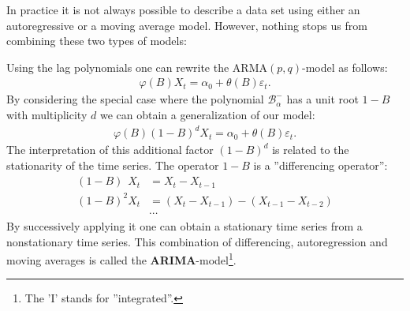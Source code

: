 
    In practice it is not always possible to describe a data set using either an autoregressive or a moving average model. However, nothing stops us from combining these two types of models:

    Using the lag polynomials one can rewrite the $\text{ARMA}(p,q)$-model as follows:
    \begin{gather}
        \varphi(B)X_t = \alpha_0 + \theta(B)\varepsilon_t.
    \end{gather}
    By considering the special case where the polynomial $\mathcal{B}^-_\alpha$ has a unit root $1-B$ with multiplicity $d$ we can obtain a generalization of our model:
    \begin{gather}
        \varphi(B)(1-B)^dX_t = \alpha_0 + \theta(B)\varepsilon_t.
    \end{gather}
    The interpretation of this additional factor $(1-B)^d$ is related to the stationarity of the time series. The operator $1-B$ is a ''differencing operator'':
    \begin{align*}
        (1-B)\phantom{^2}X_t &= X_t - X_{t-1}\\
        (1-B)^2X_t &= (X_t-X_{t-1}) - (X_{t-1}-X_{t-2})\\
        &\cdots
    \end{align*}
    By successively applying it one can obtain a stationary time series from a nonstationary time series. This combination of differencing, autoregression and moving averages is called the \textbf{ARIMA}-model\footnote{The 'I' stands for ''integrated''.}.

